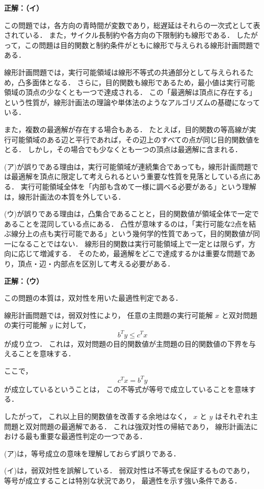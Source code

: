 \begin{example}[title={クイズ2 正解・解説}]
\label{ans:lp2}
\textbf{正解：（イ）}

この問題では，各方向の青時間が変数であり，総遅延はそれらの一次式として表されている．
また，サイクル長制約や各方向の下限制約も線形である．
したがって，この問題は目的関数と制約条件がともに線形で与えられる線形計画問題である．

線形計画問題では，実行可能領域は線形不等式の共通部分として与えられるため，凸多面体となる．
さらに，目的関数も線形であるため，最小値は実行可能領域の頂点の少なくとも一つで達成される．
この「最適解は頂点に存在する」という性質が，線形計画法の理論や単体法のようなアルゴリズムの基礎になっている．

また，複数の最適解が存在する場合もある．
たとえば，目的関数の等高線が実行可能領域のある辺と平行であれば，その辺上のすべての点が同じ目的関数値をとる．
しかし，その場合でも少なくとも一つの頂点は最適解に含まれる．

(ア)が誤りである理由は，実行可能領域が連続集合であっても，線形計画問題では最適解を頂点に限定して考えられるという重要な性質を見落としている点にある．
実行可能領域全体を「内部も含めて一様に調べる必要がある」という理解は，線形計画法の本質を外している．

(ウ)が誤りである理由は，凸集合であることと，目的関数値が領域全体で一定であることを混同している点にある．
凸性が意味するのは，「実行可能な2点を結ぶ線分上の点も実行可能である」という幾何学的性質であって，目的関数値が同一になることではない．
線形目的関数は実行可能領域上で一定とは限らず，方向に応じて増減する．
そのため，最適解をどこで達成するかは重要な問題であり，頂点・辺・内部点を区別して考える必要がある．

\end{example}


\begin{example}[title={クイズ3 正解・解説}]
\label{ans:dual4}
\textbf{正解：（ウ）}

この問題の本質は，双対性を用いた最適性判定である．

線形計画問題では，弱双対性により，
任意の主問題の実行可能解 $x$ と双対問題の実行可能解 $y$ に対して，
\[
b^T y \le c^T x
\]
が成り立つ．
これは，双対問題の目的関数値が主問題の目的関数値の下界を与えることを意味する．

ここで，
\[
c^T x = b^T y
\]
が成立しているということは，
この不等式が等号で成立していることを意味する．

したがって，
これ以上目的関数値を改善する余地はなく，
$x$ と $y$ はそれぞれ主問題と双対問題の最適解である．
これは強双対性の帰結であり，
線形計画法における最も重要な最適性判定の一つである．

(ア)は，等号成立の意味を理解しておらず誤りである．

(イ)は，弱双対性を誤解している．
弱双対性は不等式を保証するものであり，
等号が成立することは特別な状況であり，
最適性を示す強い条件である．

\end{example}

